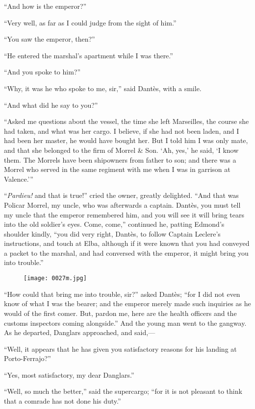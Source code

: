 “And how is the emperor?”

“Very well, as far as I could judge from the sight of him.”

“You saw the emperor, then?”

“He entered the marshal’s apartment while I was there.”

“And you spoke to him?”

“Why, it was he who spoke to me, sir,” said Dantès, with a smile.

“And what did he say to you?”

“Asked me questions about the vessel, the time she left Marseilles, the
course she had taken, and what was her cargo. I believe, if she had not
been laden, and I had been her master, he would have bought her. But I
told him I was only mate, and that she belonged to the firm of Morrel \&
Son. ‘Ah, yes,’ he said, ‘I know them. The Morrels have been shipowners
from father to son; and there was a Morrel who served in the same
regiment with me when I was in garrison at Valence.’”

“\textit{Pardieu!} and that is true!” cried the owner, greatly delighted. “And
that was Policar Morrel, my uncle, who was afterwards a captain.
Dantès, you must tell my uncle that the emperor remembered him, and you
will see it will bring tears into the old soldier’s eyes. Come, come,”
continued he, patting Edmond’s shoulder kindly, “you did very right,
Dantès, to follow Captain Leclere’s instructions, and touch at Elba,
although if it were known that you had conveyed a packet to the
marshal, and had conversed with the emperor, it might bring you into
trouble.”

\begin{figure}[h]
\texttt{[image: 0027m.jpg]}
\end{figure}

“How could that bring me into trouble, sir?” asked Dantès; “for I did
not even know of what I was the bearer; and the emperor merely made
such inquiries as he would of the first comer. But, pardon me, here are
the health officers and the customs inspectors coming alongside.” And
the young man went to the gangway. As he departed, Danglars approached,
and said,—

“Well, it appears that he has given you satisfactory reasons for his
landing at Porto-Ferrajo?”

“Yes, most satisfactory, my dear Danglars.”

“Well, so much the better,” said the supercargo; “for it is not
pleasant to think that a comrade has not done his duty.”

